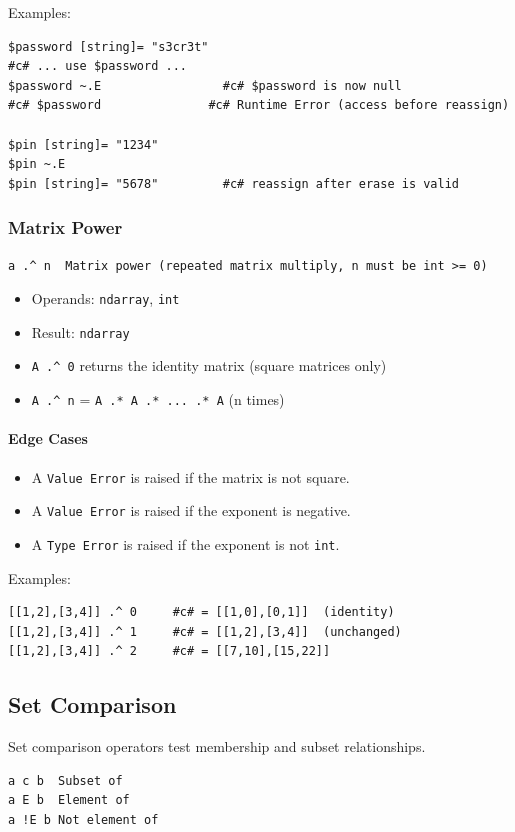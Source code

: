 Examples:
\begin{verbatim}
$password [string]= "s3cr3t"
#c# ... use $password ...
$password ~.E                 #c# $password is now null
#c# $password               #c# Runtime Error (access before reassign)

$pin [string]= "1234"
$pin ~.E
$pin [string]= "5678"         #c# reassign after erase is valid
\end{verbatim}

\subsubsection{Matrix Power}
\begin{verbatim}
a .^ n  Matrix power (repeated matrix multiply, n must be int >= 0)
\end{verbatim}

\begin{itemize}
\item Operands: \texttt{ndarray}, \texttt{int}
\item Result: \texttt{ndarray}
\item \texttt{A .\^{} 0} returns the identity matrix (square matrices only)
\item \texttt{A .\^{} n} = \texttt{A .* A .* ... .* A} (n times)
\end{itemize}

\paragraph{Edge Cases}
\begin{itemize}
\item A \texttt{Value Error} is raised if the matrix is not square.
\item A \texttt{Value Error} is raised if the exponent is negative.
\item A \texttt{Type Error} is raised if the exponent is not \texttt{int}.
\end{itemize}

Examples:
\begin{verbatim}
[[1,2],[3,4]] .^ 0     #c# = [[1,0],[0,1]]  (identity)
[[1,2],[3,4]] .^ 1     #c# = [[1,2],[3,4]]  (unchanged)
[[1,2],[3,4]] .^ 2     #c# = [[7,10],[15,22]]
\end{verbatim}

\subsection{Set Comparison}
Set comparison operators test membership and subset relationships.
\begin{verbatim}
a c b  Subset of
a E b  Element of
a !E b Not element of
\end{verbatim}


